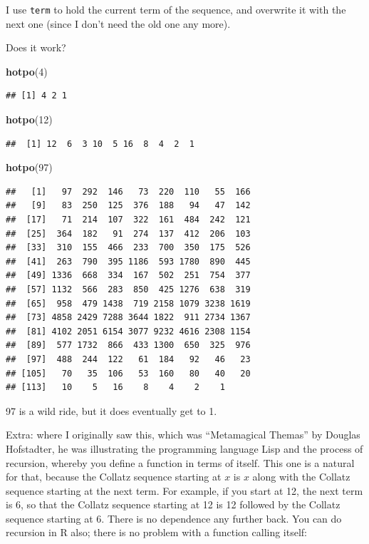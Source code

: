 \documentclass[]{tufte-book}
\newenvironment{Shaded}{}{}
\newcommand{\DecValTok}[1]{\textcolor[rgb]{0.25,0.63,0.44}{#1}}
\newcommand{\KeywordTok}[1]{\textcolor[rgb]{0.00,0.44,0.13}{\textbf{#1}}}
\newcommand{\NormalTok}[1]{#1}
\theoremstyle{definition}
\theoremstyle{definition}
\theoremstyle{definition}
\theoremstyle{remark}
\begin{document}
I use \texttt{term} to hold the current term of the sequence, and
overwrite it with the next one (since I don't need the old one any
more).

Does it work?

\begin{Shaded}
\begin{Highlighting}[]
\KeywordTok{hotpo}\NormalTok{(}\DecValTok{4}\NormalTok{)}
\end{Highlighting}
\end{Shaded}

\begin{verbatim}
## [1] 4 2 1
\end{verbatim}

\begin{Shaded}
\begin{Highlighting}[]
\KeywordTok{hotpo}\NormalTok{(}\DecValTok{12}\NormalTok{)}
\end{Highlighting}
\end{Shaded}

\begin{verbatim}
##  [1] 12  6  3 10  5 16  8  4  2  1
\end{verbatim}

\begin{Shaded}
\begin{Highlighting}[]
\KeywordTok{hotpo}\NormalTok{(}\DecValTok{97}\NormalTok{)}
\end{Highlighting}
\end{Shaded}

\begin{verbatim}
##   [1]   97  292  146   73  220  110   55  166
##   [9]   83  250  125  376  188   94   47  142
##  [17]   71  214  107  322  161  484  242  121
##  [25]  364  182   91  274  137  412  206  103
##  [33]  310  155  466  233  700  350  175  526
##  [41]  263  790  395 1186  593 1780  890  445
##  [49] 1336  668  334  167  502  251  754  377
##  [57] 1132  566  283  850  425 1276  638  319
##  [65]  958  479 1438  719 2158 1079 3238 1619
##  [73] 4858 2429 7288 3644 1822  911 2734 1367
##  [81] 4102 2051 6154 3077 9232 4616 2308 1154
##  [89]  577 1732  866  433 1300  650  325  976
##  [97]  488  244  122   61  184   92   46   23
## [105]   70   35  106   53  160   80   40   20
## [113]   10    5   16    8    4    2    1
\end{verbatim}

97 is a wild ride, but it does eventually get to 1.

Extra: where I originally saw this, which was ``Metamagical Themas'' by
Douglas Hofstadter, he was illustrating the programming language Lisp
and the process of recursion, whereby you define a function in terms of
itself. This one is a natural for that, because the Collatz sequence
starting at \(x\) is \(x\) along with the Collatz sequence starting at
the next term. For example, if you start at 12, the next term is 6, so
that the Collatz sequence starting at 12 is 12 followed by the Collatz
sequence starting at 6. There is no dependence any further back. You can
do recursion in R also; there is no problem with a function calling
itself:
\end{document}
